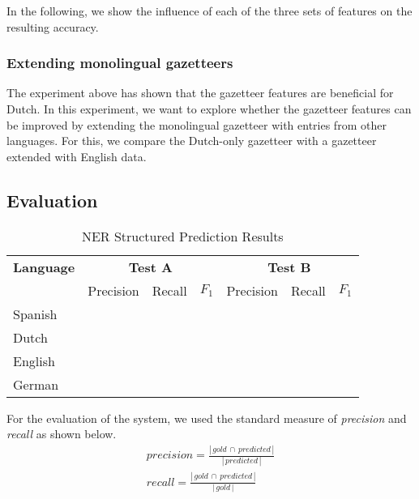\documentclass[11pt]{article}
\begin{document}
In the following, we show the influence of each of the three sets of features on the resulting accuracy.


\subsubsection{Extending monolingual gazetteers}

The experiment above has shown that the gazetteer features are beneficial for Dutch. In this experiment, we want to explore whether the gazetteer features can be improved by extending the monolingual gazetteer with entries from other languages. For this, we compare the Dutch-only gazetteer with a gazetteer extended with English data.



\subsection{Evaluation}

\begin{table*}[t]
\centering
\begin{tabular}{| l | l l l| l l l |}

\hline
\bf Language & \multicolumn{3}{c|}{ \bf Test A}&\multicolumn{3}{c|}{ \bf Test B}\\
             & Precision & Recall & $F_1$ & Precision & Recall & $F_1$ \\ \hline
Spanish &       &          &     &          &               & \\
Dutch  &         &          &     &          &               &   \\
English &        &          &     &          &               &       \\
German &      &          &       &          &             & \\
\hline
\end{tabular}
\caption{NER Structured Prediction Results }
\label{table:Results}
\end{table*}

For the evaluation of the system, we used the standard measure of \emph{precision} and \emph{recall} as shown below.
\begin{align*}
     precision =  \frac{  |\,gold\,\cap\,predicted\,| }{ |\,predicted\,| } \\
     recall = \frac{ |\,gold\,\cap\,predicted\,| }{ |\,gold\,| }
\end{align*}
\end{document}
